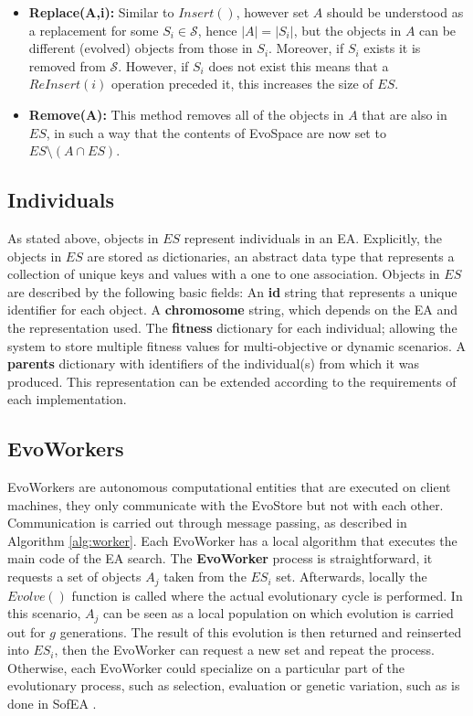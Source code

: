 \begin{itemize}
 \item \textbf{Replace(A,i):} Similar to $Insert()$, however set $A$ should be understood as a replacement for
  some $S_i \in \mathcal{S}$, hence $|A| = |S_i|$, but the objects in $A$ can be different (evolved) objects from those in $S_i$.
  Moreover, if $S_i$ exists it is removed from $\mathcal{S}$.
  However, if $S_i$ does not exist this means that a $ReInsert(i)$ operation preceded it, this increases the size of $ES$.

 \item \textbf{Remove(A):} This method removes all of the objects in $A$ that are also in $ES$, in such a way that
  the contents of EvoSpace are now set to $ES \setminus (A\cap ES)$.
\end{itemize}


\subsection{Individuals}
As stated above, objects in $ES$ represent individuals in an EA. 
Explicitly, the objects in $ES$ are stored as dictionaries, an abstract data type that represents a collection of unique keys and values with a one to one association.
Objects in $ES$ are described by the following basic fields:
An \textbf{id} string that represents a unique identifier for each object.
A \textbf{chromosome} string, which depends on the EA and the representation used.
The \textbf{fitness} dictionary for each individual; allowing the system to store multiple fitness values for multi-objective or dynamic scenarios.
A \textbf{parents} dictionary with identifiers of the individual(s) from which it was produced.
This representation can be extended according to the requirements of each implementation. 



\subsection{EvoWorkers}
EvoWorkers are autonomous computational entities that are executed on client machines, they only communicate with the EvoStore but not with each other. Communication is carried out through message passing, as described in Algorithm \ref{alg:worker}. Each EvoWorker has a local algorithm that executes the main code of the EA search. The \textbf{EvoWorker} process is straightforward, it requests a set of objects $A_j$ taken from the $ES_i$ set.
Afterwards, locally the $Evolve()$ function is called where the actual evolutionary cycle is performed. In this scenario, $A_j$ can be seen as a local population on which evolution is carried out for $g$ generations. The result of this evolution is then returned and reinserted into $ES_i$, then the EvoWorker can request a new set and repeat the process. Otherwise, each EvoWorker could specialize on a particular part of the evolutionary process, such as selection, evaluation or genetic variation,
such as is done in SofEA \cite{sofea1}.



